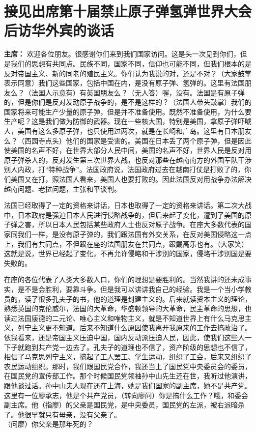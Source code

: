 \section[接见出席第十届禁止原子弹氢弹世界大会后访华外宾的谈话（一九六四年八月二十二日）]{接见出席第十届禁止原子弹氢弹世界大会后访华外宾的谈话}


\begin{duihua}

\item[\textbf{主席：}] 欢迎各位朋友。很感谢你们来到我们国家访问。这是头一次见到你们，但是我们的思想有共同点。民族不同，国家不同，信仰也可能不同，但我们根本的是反对帝国主义、新的同老的殖民主义。你们认为我说的对，还是不对？（大家鼓掌表示同意）我们这些国家，包括中国在内，是没有原子弹、氢弹的。这里有法国朋友么？（法国人示意有）有英国朋友么？（无人答）喔，没有。法国是有原子弹的，但是你们是反对发动原子战争的，是不是这样的？（法国人带头鼓掌）我们的国家将来可能生产少量的原子弹，但是并不准备使用。既然不准备使用，为什么要生产呢？这是我们做为防御的武器。现在一些核大国，特别是美国，拿原子弹吓唬人，美国有这么多原子弹，也只使用过两次，就是在长崎和广岛。这里有日本朋友么？（西园寺点头）他们的国家是受害的。美国在日本丢了两个原子弹，但是因此使美国的名声不好，在世界大部分人民中间，美国的名声不好，世界人民是反对用原子弹杀人的，反对发生第三次世界大战，也反对那些在越南南方的外国军队干涉别人内政，打“特种战争”。法国政府说，法国政府过去在越南打仗是打败了的，你们美国又在打，照法国人看来，美国人也要打败的。因此法国反对用战争办法解决越南问题、老挝问题，主张和平谈判。

法国已经取得了一定的资格来讲话，日本也取得了一定的资格来讲话。第二次大战中，日本政府是强迫日本人民进行侵略战争的，但后来起了变化，遭到了美国的原子弹之害，所以日本人民包括某些政府人士也反对原子战争。在座大多数代表的国家同我们一样，是没有原子弹的，我们跟法国有外交关系，在反对美国侵略这一点上，我们有共同点，不但跟在座的法国朋友在共同点，跟戴高乐也有。（大家笑）这就是说，世界已经起了变化，不再允许侵略和干涉别的国家，侵略干涉别国是要失败的。

在座的各位代表了人类大多数人口，你们的理想是要胜利的。当然我讲的还未成事实，是不是会胜利，要靠斗争。但是我可以讲讲我自己的经验。我是一个当小学教员的，读了很多孔夫子的书，他的道理是封建主义的。后来就读资本主义的理论，熟悉英国的克伦威尔，法国的大革命，华盛顿领导的大革命，民主革命的思想，也读过法国康德的二元论、唯心主义和唯物主义，就是不知道世界上有什么马克思主义，列宁主义更不知道。后来不知道什么原因使我离开我原来的工作去搞政治了。依我看来，还是帝国主义压迫中国，国内反动派压迫人民，因此，使我们这些人一下子就跑到共产党一边去了。孔夫子的道理也不信了，资产阶级的思想也不信了，相信了马克思列宁主义，搞起了工人罢工、学生运动，组织了工会，后来又组织了农民运动组织。那时，我们跟国民党合作，我还当上了国民党中央委员会的委员，在国民党的宣传部工作。那个时候国民党领袖孙中山先生还在世，我听过他演讲，跟他谈过话。孙中山夫人现在还在上海，她是我们国家的副主席，她不是共产党。 这里有一位廖承志，他是个共产党员，（转向廖问）你是搞什么工作？哦，和委会副主席。他（指廖）的父亲是国民党，是中央委员，国民党的左派，被右派暗杀了。他很早就只有母亲，没有父亲了。\\（问廖）你父亲是那年死的？


\end{duihua}
